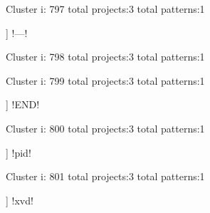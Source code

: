 Cluster i: 797
total projects:3
total patterns:1
\begin{multicols}{1}
\begin{description}[noitemsep,topsep=0pt]
\item [[3] ] \cverb!---!
\end{description}
\end{multicols}







Cluster i: 798
total projects:3
total patterns:1
\begin{multicols}{1}
\begin{description}[noitemsep,topsep=0pt]
\item [[3] ] \cverb!#+$!
\end{description}
\end{multicols}







Cluster i: 799
total projects:3
total patterns:1
\begin{multicols}{1}
\begin{description}[noitemsep,topsep=0pt]
\item [[3] ] \cverb!END!
\end{description}
\end{multicols}







Cluster i: 800
total projects:3
total patterns:1
\begin{multicols}{1}
\begin{description}[noitemsep,topsep=0pt]
\item [[3] ] \cverb!pid!
\end{description}
\end{multicols}







Cluster i: 801
total projects:3
total patterns:1
\begin{multicols}{1}
\begin{description}[noitemsep,topsep=0pt]
\item [[3] ] \cverb!xvd!
\end{description}
\end{multicols}








